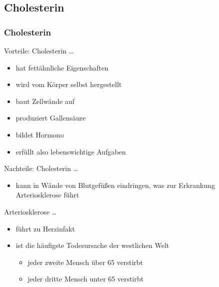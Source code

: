 \documentclass[xcolor=dvipsnames]{beamer}
\begin{document}
    \subsection{Cholesterin}
    \begin{frame}[allowframebreaks]
        \frametitle{Cholesterin}

        \begin{block}{Vorteile: Cholesterin \ldots}
            \begin{itemize}
                \setlength\itemsep{1em}
                \item hat fettähnliche Eigenschaften
                \item wird vom Körper selbst hergestellt
                \item baut Zellwände auf
                \item produziert Gallensäure
                \item bildet Hormono
                \item erfüllt also lebenswichtige Aufgaben
            \end{itemize}
        \end{block}

        \framebreak

        \begin{block}{Nachteile: Cholesterin \ldots}
            \begin{itemize}
                \setlength\itemsep{1em}
                \item kann in Wände von Blutgefüßen eindringen, was zur Erkrankung Arteriosklerose führt
            \end{itemize}
        \end{block}

        \begin{block}{Arteriosklerose \ldots}
            \begin{itemize}
                \setlength\itemsep{1em}
                \item führt zu Herzinfakt
                \item ist die häufigste Todesursache der westlichen Welt
                \begin{itemize}
                    \item jeder zweite Mensch über 65 verstirbt
                    \item jeder dritte Mensch unter 65 verstirbt
                \end{itemize}
            \end{itemize}
        \end{block}

    \end{frame}
\end{document}
